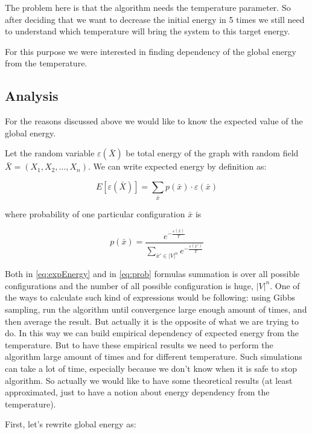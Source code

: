 \documentclass[12pt]{report}
\begin{document}
The problem here is that the algorithm needs the temperature parameter. So after deciding that we want to decrease the initial energy in 5 times we still need to understand which temperature will bring the system to this target energy.

For this purpose we were interested in finding dependency of the global energy from the temperature. 


\subsection{Analysis}

For the reasons discussed above we would like to know the expected value of the global energy. 

Let the random variable $ \varepsilon (\bar{X})$ be total energy of the graph with random field $\bar{X} = (X_1, X_2, ..., X_n)$. We can write expected energy by definition as:

\begin{equation}\label{eq:expEnergy}
E[\varepsilon (\bar{X})] = \sum\limits_{\bar{x}} p(\bar{x}) \cdot \varepsilon(\bar{x})
\end{equation}


where probability of one particular configuration $\bar{x}$ is  

\begin{equation}\label{eq:prob}
p(\bar{x}) = \frac{ e^{-\frac{ \varepsilon (\bar{x})}{T}} }{ \sum\limits_{\bar{x}'\in |V|^n} e^{-\frac{\varepsilon(\bar{x}')}{T}}} 
\end{equation}

Both in \ref{eq:expEnergy} and in \ref{eq:prob} formulas summation is over all possible configurations and the number of all possible configuration is huge, $|V|^n$. One of the ways to calculate such kind of expressions would be following: using Gibbs sampling, run the algorithm until convergence large enough amount of times, and then average the result. But actually it is the opposite of what we are trying to do. In this way we can build empirical dependency of expected energy from the temperature. But to have these empirical results we need to perform the algorithm large amount of times and for different temperature. Such simulations can take a lot of time, especially because we don't know when it is safe to stop algorithm. So actually we would like to have some theoretical results (at least approximated, just to have a notion about energy dependency from the temperature).

First, let's rewrite global energy as:
\end{document}
